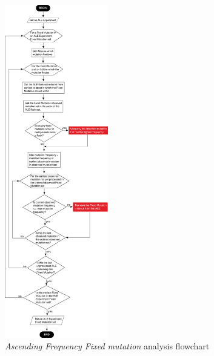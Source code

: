 \documentclass[12pt,final,masters,chapterheads]{ucsd}  %
\begin{document}
\begin{figure}[h!]
  \caption{\textit{Ascending Frequency Fixed mutation} analysis flowchart}
  \centering
  \includegraphics[width=0.4\textwidth]{ascending_freq_fixation_mutation_filter_flowchart.png}
\end{figure}

%
%

%
%
\end{document}
